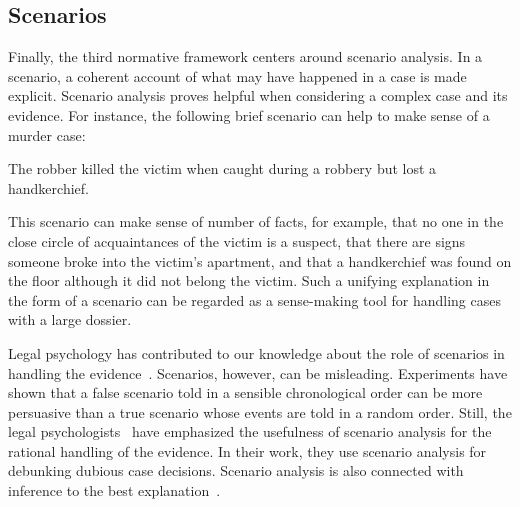 \documentclass[10pt]{article}
\begin{document}
\subsection{Scenarios}
\label{sec:introScen}
Finally, the third normative framework %
centers around scenario analysis. In a scenario, a coherent account of what may have happened in a case is made explicit. %
Scenario analysis proves helpful when considering a complex case and its evidence. 
For instance, the following brief scenario can help to make sense of a murder case:
%
\begin{description}
	\item The robber killed the victim when caught during a robbery but lost a handkerchief. 	
\end{description}
%
\noindent This scenario can make sense of number of facts, for example, that no one in the close circle of acquaintances 
of the victim is a suspect, that there are signs someone broke into the victim's apartment, and that a handkerchief 
was found on the floor although it did not belong the victim. 
Such a unifying explanation in the form of
a scenario can be regarded as a sense-making tool for handling 
cases with a large dossier. 
%
%



Legal psychology has contributed to our knowledge about the role of scenarios in handling the evidence~\citep{bennettFeldman1981,penningtonHastie1993}. Scenarios, however, 
can be misleading. Experiments have shown that a false scenario told in a sensible chronological order can be more persuasive 
than a true scenario whose events are told in a random order. Still, the legal psychologists~\citet{wagenaarEtal1993} have
emphasized the usefulness of scenario analysis for the rational handling of the evidence. In their work, they use scenario analysis for 
debunking dubious case decisions. Scenario analysis is also connected with inference to the best explanation~\citep{pardoAllen2008}.
\end{document}
